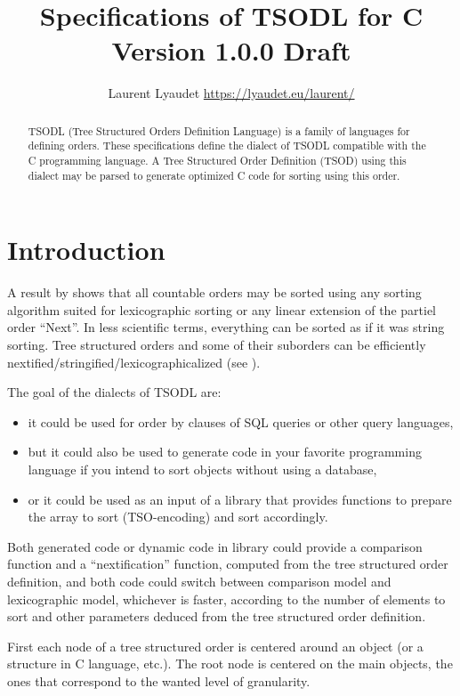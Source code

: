\documentclass[a4paper,11pt]{report}
\author{Laurent Lyaudet \url{https://lyaudet.eu/laurent/}}
\title{
  Specifications of TSODL for C\\
  Version 1.0.0 Draft
}
\begin{document}
\maketitle

\begin{abstract}
TSODL (Tree Structured Orders Definition Language) is a family of languages for defining orders.
These specifications define the dialect of TSODL compatible with the C programming language.
A Tree Structured Order Definition (TSOD) using this dialect
may be parsed to generate optimized C code for sorting using this order.
\end{abstract}

\tableofcontents

\chapter{Introduction}
\label{chapter:introduction}

A result by \cite{Cantor1895} shows that all countable orders may be sorted using any sorting algorithm suited
for lexicographic sorting or any linear extension of the partiel order ``Next''.
In less scientific terms, everything can be sorted as if it was string sorting.
Tree structured orders and some of their suborders can be efficiently
nextified/stringified/lexicographicalized (see \cite{DBLP:journals/corr/abs-1809-00954}).

The goal of the dialects of TSODL are:
\begin{itemize}
\item it could be used for order by clauses of SQL queries or other query languages,
\item but it could also be used to generate code in your favorite programming language if you intend to sort objects without using a database,
\item or it could be used as an input of a library that provides functions to prepare the array to sort (TSO-encoding) and sort accordingly.
\end{itemize}
Both generated code or dynamic code in library could provide a comparison function and a ``nextification'' function,
computed from the tree structured order definition,
and both code could switch between comparison model and lexicographic model, whichever is faster,
according to the number of elements to sort and other parameters deduced from the tree structured order definition.

First each node of a tree structured order is centered around an object (or a structure in C language, etc.).
The root node is centered on the main objects, the ones that correspond to the wanted level of granularity.
\end{document}
